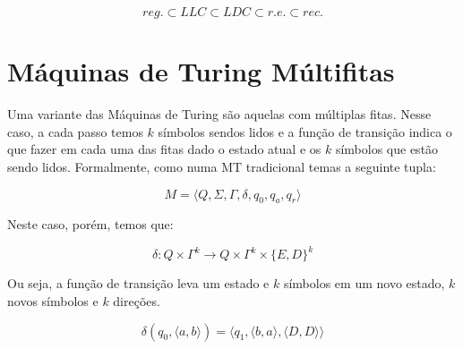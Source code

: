 \begin{displaymath}
  reg. \subset LLC \subset LDC \subset r.e. \subset rec.
\end{displaymath}


\section{Máquinas de Turing Múltifitas}
\label{sec:mt-fitas}

Uma variante das Máquinas de Turing são aquelas com múltiplas fitas.
Nesse caso, a cada passo temos $k$ símbolos sendos lidos e a função de transição indica o que fazer em cada uma das fitas dado o estado atual e os $k$ símbolos que estão sendo lidos.
Formalmente, como numa MT tradicional temas a seguinte tupla:

\begin{displaymath}
M = \langle Q, \Sigma, \Gamma, \delta, q_0, q_a, q_r \rangle
\end{displaymath}

Neste caso, porém, temos que:

\begin{displaymath}
\delta : Q \times \Gamma^k \to Q \times \Gamma^k \times \{E, D\}^k
\end{displaymath}

Ou seja, a função de transição leva um estado e $k$ símbolos em um novo estado, $k$ novos símbolos e $k$ direções.

\begin{example}
  \begin{displaymath}
    \delta(q_0, \langle a, b \rangle) = \langle q_1, \langle b,a \rangle, \langle D, D \rangle \rangle
  \end{displaymath}
  
  \begin{center}
  \end{center}
\end{example}

